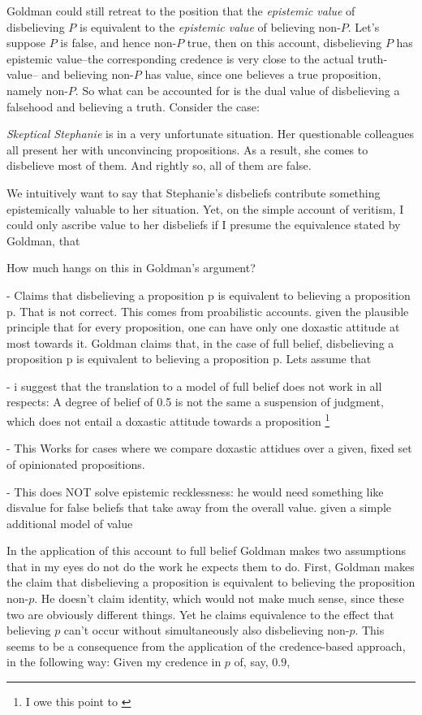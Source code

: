 \documentclass[12pt,numbers=noenddot]{scrartcl}
\begin{document}
Goldman could still retreat to the position that the \emph{epistemic value} of disbelieving $P$ is equivalent to the \emph{epistemic value} of believing non-$P$. Let's suppose $P$ is false, and hence non-$P$ true, then on this account, disbelieving $P$ has epistemic value–the corresponding credence is very close to the actual truth-value– and believing non-$P$ has value, since one believes a true proposition, namely non-$P$. So what can be accounted for is the dual value of disbelieving a falsehood and believing a truth. Consider the case:

\emph{Skeptical Stephanie} is in a very unfortunate situation. Her questionable colleagues all present her with unconvincing propositions. As a result, she comes to disbelieve most of them. And rightly so, all of them are false.

We intuitively want to say that Stephanie's disbeliefs contribute something epistemically valuable to her situation. Yet, on the simple account of veritism, I could only ascribe value to her disbeliefs if I presume the equivalence stated by Goldman, that

How much hangs on this in Goldman's argument?

- Claims that disbelieving a proposition p is equivalent to believing a proposition p. That is not correct. This comes from proabilistic accounts. given the plausible principle that for every proposition, one can have only one doxastic attitude at most towards it.
Goldman claims that, in the case of full belief, disbelieving a proposition p is equivalent to believing a proposition p. Lets assume that

- i suggest that the translation to a model of full belief does not work in all respects: A degree of belief of 0.5 is not the same a suspension of judgment, which does not entail a doxastic attitude towards a proposition \footnote{I owe this point to \textcite{Balg2018} }

- This Works for cases where we compare doxastic attidues over a given, fixed set of opinionated propositions.

- This does NOT solve epistemic recklessness: he would need something like disvalue for false beliefs that take away from the overall value. given a simple additional model of value



In the application of this account to full belief Goldman makes two assumptions that in my eyes do not do the work he expects them to do. First, Goldman makes the claim that disbelieving a proposition is equivalent to believing the proposition non-$p$. He doesn't claim identity, which would not make much sense, since these two are obviously different things. Yet he claims equivalence to the effect that believing $p$ can't occur without simultaneously also disbelieving non-$p$. This seems to be a consequence from the application of the credence-based approach, in the following way: Given my credence in $p$ of, say, $0.9$, 
\end{document}
